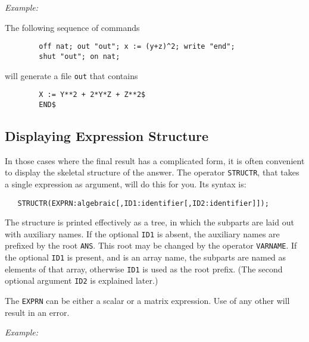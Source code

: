 {\it Example:}

The following sequence of commands
\begin{verbatim}
        off nat; out "out"; x := (y+z)^2; write "end";
        shut "out"; on nat;
\end{verbatim}
will generate a file {\tt out} that contains
\begin{verbatim}
        X := Y**2 + 2*Y*Z + Z**2$
        END$
\end{verbatim}

\subsection{Displaying Expression Structure}

In those cases where the final result has a complicated form, it is often
convenient to display the skeletal structure of the answer.  The operator
{\tt STRUCTR}, that takes a single expression as argument,
will do this for you.  Its syntax is:
\begin{verbatim}
   STRUCTR(EXPRN:algebraic[,ID1:identifier[,ID2:identifier]]);
\end{verbatim}
The structure is printed effectively as a tree, in which the subparts are
laid out with auxiliary names.  If the optional {\tt ID1} is absent, the
auxiliary names are prefixed by the root {\tt ANS}.  This root may be
changed by the operator {\tt VARNAME}.  If the
optional {\tt ID1} is present, and is an array name, the subparts are
named as elements of that array, otherwise {\tt ID1} is used as the root
prefix. (The second optional argument {\tt ID2} is explained later.)

The {\tt EXPRN} can be either a scalar or a matrix expression.  Use of any
other will result in an error.

{\it Example:}

